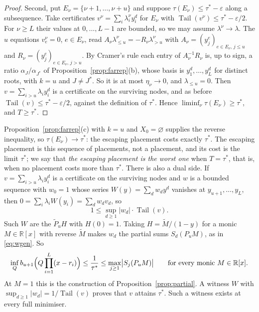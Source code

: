 \documentclass[11pt]{article}
\theoremstyle{definition}
\theoremstyle{plain}
\newcommand{\R}{\mathbb R}
\DeclareMathOperator{\Tail}{Tail}
\begin{document}
\begin{proof}
Second, put $E_\nu=\{\nu+1,\ldots,\nu+u\}$ and suppose
$\tau(E_\nu)\le\tau^*-\varepsilon$ along a subsequence.  Take certificates
$v^\nu=\sum_i\lambda^\nu_iy_i^d$ for $E_\nu$ with
$\Tail(v^\nu)\le\tau^*-\varepsilon/2$.  For $\nu\ge L$ their values at
$0,\ldots,L-1$ are bounded, so we may assume $\lambda^\nu\to\lambda$.  The $u$
equations $v^\nu_e=0$, $e\in E_\nu$, read
$A_\nu\lambda^\nu_{\le u}=-R_\nu\lambda^\nu_{>u}$ with
$A_\nu=(y_j^e)_{e\in E_\nu,\,j\le u}$ and
$R_\nu=(y_j^e)_{e\in E_\nu,\,j>u}$.  By Cramer's rule each entry of
$A_\nu^{-1}R_\nu$ is, up to sign, a ratio $\alpha_J/\alpha_{J^*}$ of
Proposition~\ref{prop:farrep}(b), whose basis is $y_1^d,\ldots,y_L^d$ for
distinct roots, with $k=u$ and $J\ne J^*$.  So it is at most $\eta_\nu\to0$, and $\lambda_{\le u}=0$.  Then
$v=\sum_{i>u}\lambda_iy_i^d$ is a certificate on the surviving nodes, and as
before $\Tail(v)\le\tau^*-\varepsilon/2$, against the definition of $\tau^*$.
Hence $\liminf_\nu\tau(E_\nu)\ge\tau^*$, and $T\ge\tau^*$.
\end{proof}

Proposition~\ref{prop:farrep}(c) with $k=u$ and $X_0=\varnothing$ supplies the
reverse inequality, so $\tau(E_\nu)\to\tau^*$:
the escaping placement costs exactly $\tau^*$.  The escaping placement is
this sequence of placements, not a placement, and its cost is the limit
$\tau^*$; we say that \emph{the escaping placement is the worst one} when
$T=\tau^*$, that is, when no placement costs more than $\tau^*$.  There is also a dual side.  If
$v=\sum_{i>u}\lambda_iy_i^d$ is a certificate on the surviving nodes and $w$
is a bounded sequence with $w_0=1$ whose series $W(y)=\sum_dw_dy^d$ vanishes
at $y_{u+1},\ldots,y_L$, then $0=\sum_i\lambda_iW(y_i)=\sum_dw_dv_d$, so
\begin{equation}\label{eq:dualpair}
  1\le\sup_{d\ge1}|w_d|\cdot\Tail(v).
\end{equation}
Such $W$ are the $\widetilde P_uH$ with $H(0)=1$.  Taking
$H=\widetilde M/(1-y)$ for a monic $M\in\R[x]$ with reverse $\widetilde M$
makes $w_d$ the partial sums $S_d(P_uM)$, as in \eqref{eq:wgen}.  So
\begin{equation}\label{eq:multiplier}
  \inf_Qb_{u+1}\Bigl(Q\prod_{i=1}^L(x-r_i)\Bigr)\le\frac1{\tau^*}
  \le\max_{j\ge1}\bigl|S_j(P_uM)\bigr|
  \qquad\text{for every monic }M\in\R[x].
\end{equation}
At $M=1$ this is the construction of Proposition~\ref{prop:partial}.  A
witness $W$ with $\sup_{d\ge1}|w_d|=1/\Tail(v)$ proves that $v$ attains
$\tau^*$.  Such a witness exists at every full minimiser.
\end{document}
